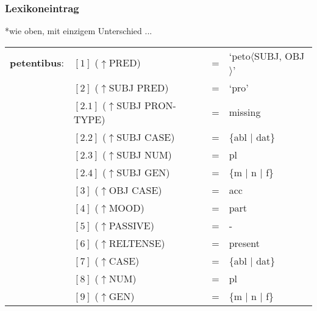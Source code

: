 \documentclass[12pt,a4paper]{article}
\begin{document}
\subsubsection{Lexikoneintrag}
*wie oben, mit einzigem Unterschied ...

\begin{singlespace}
\begin{tabular}{ l  l  l  l  } 
\textbf{petentibus}: & $[1]$ \:  ($\uparrow$PRED) & = & `peto$\langle$SUBJ, OBJ$\rangle$' \\
$\qquad$ & $[2]$ \:  ($\uparrow$SUBJ PRED) & = & `pro' \\
$\qquad$ & $[2.1]$ \:  ($\uparrow$SUBJ PRON-TYPE) & = & missing \\
$\qquad$ & $[2.2]$ \:  ($\uparrow$SUBJ CASE) & = & \{abl $\mid$ dat\} \\
$\qquad$ & $[2.3]$ \:  ($\uparrow$SUBJ NUM) & = & pl \\
$\qquad$ & $[2.4]$ \:  ($\uparrow$SUBJ GEN) & = & \{m $\mid$ n $\mid$ f\} \\
$\qquad$ & $[3]$ \:  ($\uparrow$OBJ CASE) & = & acc \\
$\qquad$ & $[4]$ \:  ($\uparrow$MOOD) & = & part\\
$\qquad$ & $[5]$ \:  ($\uparrow$PASSIVE) & = & - \\
$\qquad$ & $[6]$ \:  ($\uparrow$RELTENSE) & = & present \\ 
$\qquad$ & $[7]$ \:  ($\uparrow$CASE) & = & \{abl $\mid$ dat\} \\
$\qquad$ & $[8]$ \:  ($\uparrow$NUM) & = & pl \\
$\qquad$ & $[9]$ \:  ($\uparrow$GEN) & = & \{m $\mid$ n $\mid$ f\} \\
\end{tabular}
\newline
\newline
\end{singlespace}
\end{document}
